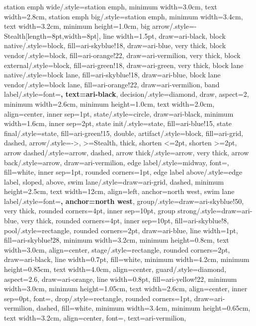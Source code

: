 {  station emph wide/.style={station emph, minimum width=3.0cm, text width=2.8cm},
  station emph big/.style={station emph, minimum width=3.4cm, text width=3.2cm, minimum height=1.0cm},
  big arrow/.style={-{Stealth[length=8pt,width=8pt]}, line width=1.5pt, draw=ari-black},
  block native/.style={block, fill=ari-skyblue!18, draw=ari-blue, very thick},
  block vendor/.style={block, fill=ari-orange!22, draw=ari-vermilion, very thick},
  block external/.style={block, fill=ari-green!18, draw=ari-green, very thick},
  block lane native/.style={block lane, fill=ari-skyblue!18, draw=ari-blue},
  block lane vendor/.style={block lane, fill=ari-orange!22, draw=ari-vermilion},
  band label/.style={font=\bfseries\footnotesize\sffamily, text=ari-black},
  decision/.style={diamond, draw, aspect=2, minimum width=2.6cm,
                   minimum height=1.0cm, text width=2.0cm,
                   align=center, inner sep=1pt},
  state/.style={circle, draw=ari-black, minimum width=1.6cm, inner sep=2pt},
  state init/.style={state, fill=ari-blue!15},
  state final/.style={state, fill=ari-green!15, double},
  artifact/.style={block, fill=ari-grid, dashed},
  arrow/.style={->, >=Stealth, thick, shorten <=2pt, shorten >=2pt},
  arrow dashed/.style={arrow, dashed},
  arrow thick/.style={arrow, very thick},
  arrow back/.style={arrow, draw=ari-vermilion},
  edge label/.style={midway, font=\footnotesize, fill=white,
                     inner sep=1pt, rounded corners=1pt},
  edge label above/.style={edge label, sloped, above},
  swim lane/.style={draw=ari-grid, dashed, minimum height=2.5cm,
                    text width=12cm, align=left, anchor=north west},
  swim lane label/.style={font=\bfseries\footnotesize, anchor=north west},
  group/.style={draw=ari-skyblue!50, very thick, rounded corners=4pt, inner sep=10pt},
  group strong/.style={draw=ari-blue, very thick, rounded corners=4pt, inner sep=10pt, fill=ari-skyblue!8},
  pool/.style={rectangle, rounded corners=2pt, draw=ari-blue, line width=1pt,
               fill=ari-skyblue!28, minimum width=3.2cm, minimum height=0.8cm,
               text width=3.0cm, align=center},
  stage/.style={rectangle, rounded corners=2pt, draw=ari-black, line width=0.7pt,
                fill=white, minimum width=4.2cm, minimum height=0.85cm,
                text width=4.0cm, align=center},
  guard/.style={diamond, aspect=2.6, draw=ari-orange, line width=0.8pt,
                fill=ari-yellow!22, minimum width=3.0cm, minimum height=1.05cm,
                text width=2.6cm, align=center, inner sep=0pt, font=\footnotesize},
  drop/.style={rectangle, rounded corners=1pt, draw=ari-vermilion, dashed,
               fill=white, minimum width=3.4cm, minimum height=0.65cm,
               text width=3.2cm, align=center, font=\scriptsize, text=ari-vermilion},
}


